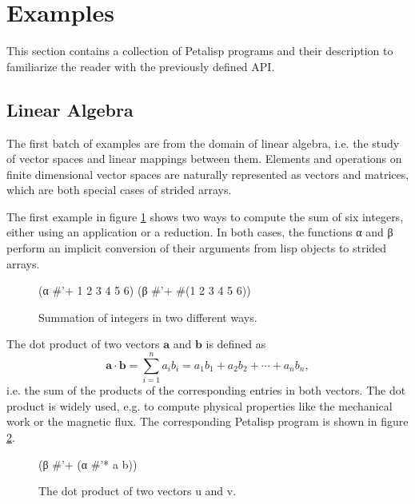 \section{Examples}
\label{sec:examples}

This section contains a collection of Petalisp programs and their
description to familiarize the reader with the previously defined
API.

\subsection{Linear Algebra}

The first batch of examples are from the domain of linear algebra, i.e. the
study of vector spaces and linear mappings between them. Elements and
operations on finite dimensional vector spaces are naturally represented as
vectors and matrices, which are both special cases of strided arrays.

The first example in figure \ref{fig:summation} shows two ways to compute
the sum of six integers, either using an application or a reduction. In
both cases, the functions α and β perform an implicit conversion of their
arguments from lisp objects to strided arrays.

\begin{figure}[h]
\resetlinenumber
\begin{code}
(α #'+ 1 2 3 4 5 6)
(β #'+ #(1 2 3 4 5 6))
\end{code}
\caption{Summation of integers in two different ways.}
\label{fig:summation}
\end{figure}

The dot product of two vectors $\mathbf{a}$ and $\mathbf{b}$ is defined as
$${ \mathbf {a} \cdot \mathbf {b} =\sum _{i=1}^{n}a_{i}b_{i}=a_{1}b_{1}+a_{2}b_{2}+\cdots +a_{n}b_{n}},$$
i.e. the sum of the products of the corresponding entries in both
vectors. The dot product is widely used, e.g. to compute physical
properties like the mechanical work or the magnetic flux. The corresponding
Petalisp program is shown in figure \ref{fig:dotproduct}.

\begin{figure}[h]
\resetlinenumber
\begin{code}
(β #'+ (α #'* a b))
\end{code}
\caption{The dot product of two vectors u and v.}
\label{fig:dotproduct}
\end{figure}


